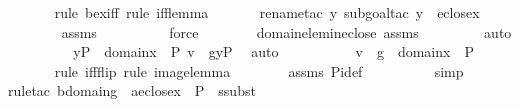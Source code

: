 \begin{isabellebody}
\ \ \ \ \ \ \isamarkupfalse%
{\isacharparenleft}{\kern0pt}rule\ bex{\isacharunderscore}{\kern0pt}iff{\isacharcomma}{\kern0pt}\ rule\ iff{\isacharunderscore}{\kern0pt}lemma{\isacharparenright}{\kern0pt}\isanewline
\ \ \ \ \ \ \isamarkupfalse%
{\isacharparenleft}{\kern0pt}rename{\isacharunderscore}{\kern0pt}tac\ y{\isacharcomma}{\kern0pt}\ subgoal{\isacharunderscore}{\kern0pt}tac\ {\isachardoublequoteopen}y\ {\isasymin}\ eclose{\isacharparenleft}{\kern0pt}x{\isacharparenright}{\kern0pt}{\isachardoublequoteclose}{\isacharparenright}{\kern0pt}\ \isanewline
\ \ \ \ \ \ \isamarkupfalse%
\ assms\ \isanewline
\ \ \ \ \ \ \ \isamarkupfalse%
\ force\isanewline
\ \ \ \ \ \ \isamarkupfalse%
\ domain{\isacharunderscore}{\kern0pt}elem{\isacharunderscore}{\kern0pt}in{\isacharunderscore}{\kern0pt}eclose\ assms\ \isanewline
\ \ \ \ \ \ \isamarkupfalse%
\ auto\isanewline
\ \ \ \ \isamarkupfalse%
\ \isamarkupfalse%
\ {\isachardoublequoteopen}{\isachardot}{\kern0pt}{\isachardot}{\kern0pt}{\isachardot}{\kern0pt}\ {\isasymlongleftrightarrow}\ {\isacharparenleft}{\kern0pt}{\isasymexists}yP\ {\isasymin}\ domain{\isacharparenleft}{\kern0pt}x{\isacharparenright}{\kern0pt}\ {\isasymtimes}\ {\isacharbraceleft}{\kern0pt}P{\isacharbraceright}{\kern0pt}{\isachardot}{\kern0pt}\ v\ {\isacharequal}{\kern0pt}\ g{\isacharbackquote}{\kern0pt}yP{\isacharparenright}{\kern0pt}{\isachardoublequoteclose}\ \isamarkupfalse%
\ auto\ \isanewline
\ \ \ \ \isamarkupfalse%
\ \isamarkupfalse%
\ {\isachardoublequoteopen}{\isachardot}{\kern0pt}{\isachardot}{\kern0pt}{\isachardot}{\kern0pt}\ {\isasymlongleftrightarrow}\ v\ {\isasymin}\ g\ {\isacharbackquote}{\kern0pt}{\isacharbackquote}{\kern0pt}\ {\isacharparenleft}{\kern0pt}domain{\isacharparenleft}{\kern0pt}x{\isacharparenright}{\kern0pt}\ {\isasymtimes}\ {\isacharbraceleft}{\kern0pt}P{\isacharbraceright}{\kern0pt}{\isacharparenright}{\kern0pt}{\isachardoublequoteclose}\ \isanewline
\ \ \ \ \ \ \isamarkupfalse%
{\isacharparenleft}{\kern0pt}rule\ iff{\isacharunderscore}{\kern0pt}flip{\isacharcomma}{\kern0pt}\ rule\ image{\isacharunderscore}{\kern0pt}lemma{\isacharparenright}{\kern0pt}\isanewline
\ \ \ \ \ \ \isamarkupfalse%
\ assms\ Pi{\isacharunderscore}{\kern0pt}def\ \isanewline
\ \ \ \ \ \ \ \isamarkupfalse%
\ simp\isanewline
\ \ \ \ \ \ \isamarkupfalse%
{\isacharparenleft}{\kern0pt}rule{\isacharunderscore}{\kern0pt}tac\ b{\isacharequal}{\kern0pt}{\isachardoublequoteopen}domain{\isacharparenleft}{\kern0pt}g{\isacharparenright}{\kern0pt}{\isachardoublequoteclose}\ \ a{\isacharequal}{\kern0pt}{\isachardoublequoteopen}eclose{\isacharparenleft}{\kern0pt}x{\isacharparenright}{\kern0pt}\ {\isasymtimes}\ {\isacharbraceleft}{\kern0pt}P{\isacharbraceright}{\kern0pt}{\isachardoublequoteclose}\ \ ssubst{\isacharparenright}{\kern0pt}\ \isanewline

\end{isabellebody}

